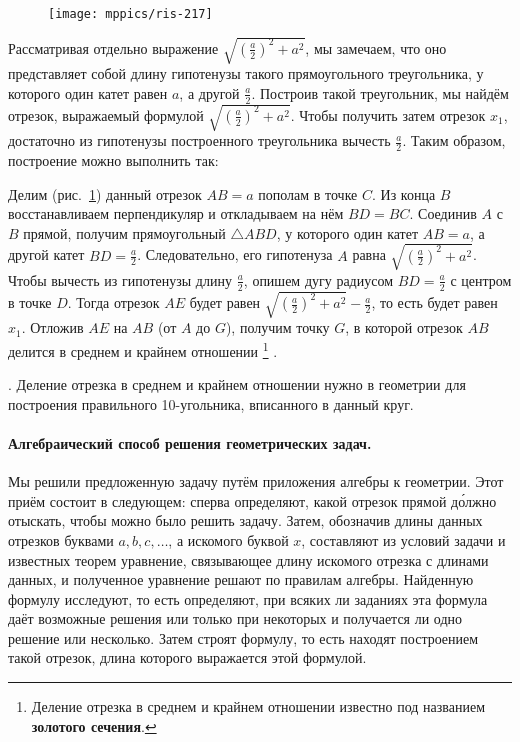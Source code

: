 \documentclass[oneside]{book}
\makeatletter
\newcommand{\rindex}[2][\imki@jobname]{%
  \index[#1]{\detokenize{#2}}%
}
\makeatother
\begin{document}
\begin{figure}
\centering
\texttt{[image: mppics/ris-217]}
\caption{}\label{1938/ris-217}
\end{figure}

\noindent
Рассматривая отдельно выражение $\sqrt{(\frac a2)^2+a^2}$, мы замечаем, что оно представляет собой длину гипотенузы такого прямоугольного треугольника, у которого один катет равен $a$, а другой $\frac a2$.
Построив такой треугольник, мы найдём отрезок, выражаемый формулой $\sqrt{(\frac a2)^2+a^2}$.
Чтобы получить затем отрезок $x_1$, достаточно из гипотенузы построенного треугольника вычесть $\frac a2$.
Таким образом, построение можно выполнить так:

Делим (рис.~\ref{1938/ris-217}) данный отрезок $AB=a$ пополам в точке $C$.
Из конца $B$ восстанавливаем перпендикуляр и откладываем на нём $BD = BC$.
Соединив $A$ с $B$ прямой, получим прямоугольный $\triangle ABD$, у которого один катет $AB=a$, а другой катет $BD=\frac a2$.
Следовательно, его гипотенуза $A$ равна $\sqrt{(\frac a2)^2+a^2}$.
Чтобы вычесть из гипотенузы длину $\frac a2$, опишем дугу радиусом $BD=\frac a2$ с центром в точке $D$.
Тогда отрезок $AE$ будет равен $\sqrt{(\frac a2)^2+a^2}-\frac a2$, 
то есть будет равен $x_1$.
Отложив $AE$ на $AB$ (от $A$ до $G$), получим точку $G$, в которой отрезок $AB$ делится в среднем и крайнем отношении%
\footnote{Деление отрезка в среднем и крайнем отношении известно под названием \rindex{золотое сечение}\textbf{золотого сечения}.}%
.

\smallskip
{}.
Деление отрезка в среднем и крайнем отношении нужно в геометрии для построения правильного 10-угольника, вписанного в данный круг.

\paragraph{Алгебраический способ решения геометрических задач.}\label{1938/210}
Мы решили предложенную задачу путём приложения алгебры к геометрии.
Этот приём состоит в следующем:
сперва определяют, какой отрезок прямой д\'{о}лжно отыскать, чтобы можно было решить задачу.
Затем, обозначив длины данных отрезков буквами $a, b, c,\dots$, а искомого буквой $x$, составляют из условий задачи и известных теорем уравнение, связывающее длину искомого отрезка с длинами данных, и полученное уравнение решают по правилам алгебры.
Найденную формулу исследуют, то есть определяют, при всяких ли заданиях эта формула даёт возможные решения или только при некоторых и получается ли одно решение или несколько.
Затем строят формулу, то есть находят построением такой отрезок, длина которого выражается этой формулой.
\end{document}
